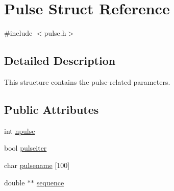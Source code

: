 \hypertarget{structPulse}{\section{Pulse Struct Reference}
\label{structPulse}
}


{\ttfamily \#include $<$pulse.\-h$>$}



\subsection{Detailed Description}
This structure contains the pulse-\/related parameters. \subsection*{Public Attributes}
\begin{DoxyCompactItemize}
\item 
int \hyperlink{structPulse_ab083ce764799722049dac44ad7479bad}{npulse}
\item 
bool \hyperlink{structPulse_a4fcad551982a417a36f160cd0a6f0975}{pulseiter}
\item 
char \hyperlink{structPulse_a94ae332f008b81e37d8df344a3c7d9b7}{pulsename} \mbox{[}100\mbox{]}
\item 
double $\ast$$\ast$ \hyperlink{structPulse_af1bd05f903769ac217b18fb0c2ebc31a}{sequence}
\end{DoxyCompactItemize}


